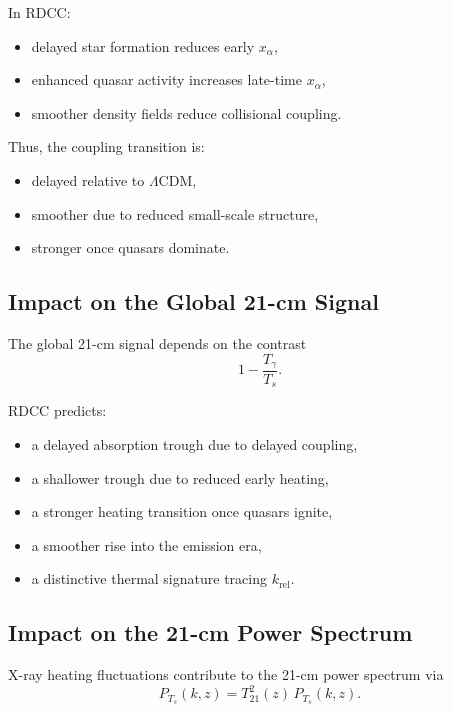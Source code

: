 \documentclass[11pt,a4paper]{article}
\begin{document}
In RDCC:
\begin{itemize}
\item delayed star formation reduces early $x_{\alpha}$,
\item enhanced quasar activity increases late-time $x_{\alpha}$,
\item smoother density fields reduce collisional coupling.
\end{itemize}

Thus, the coupling transition is:
\begin{itemize}
\item delayed relative to $\Lambda$CDM,
\item smoother due to reduced small-scale structure,
\item stronger once quasars dominate.
\end{itemize}

\subsection{Impact on the Global 21-cm Signal}

The global 21-cm signal depends on the contrast
\begin{equation}
1 - \frac{T_{\gamma}}{T_{s}}.
\end{equation}

RDCC predicts:
\begin{itemize}
\item a delayed absorption trough due to delayed coupling,
\item a shallower trough due to reduced early heating,
\item a stronger heating transition once quasars ignite,
\item a smoother rise into the emission era,
\item a distinctive thermal signature tracing $k_{\mathrm{rel}}$.
\end{itemize}

\subsection{Impact on the 21-cm Power Spectrum}

X-ray heating fluctuations contribute to the 21-cm power spectrum via
\begin{equation}
P_{T_{s}}(k,z)
=
T_{21}^{2}(z)\,
P_{T_{s}}(k,z).
\end{equation}
\end{document}
